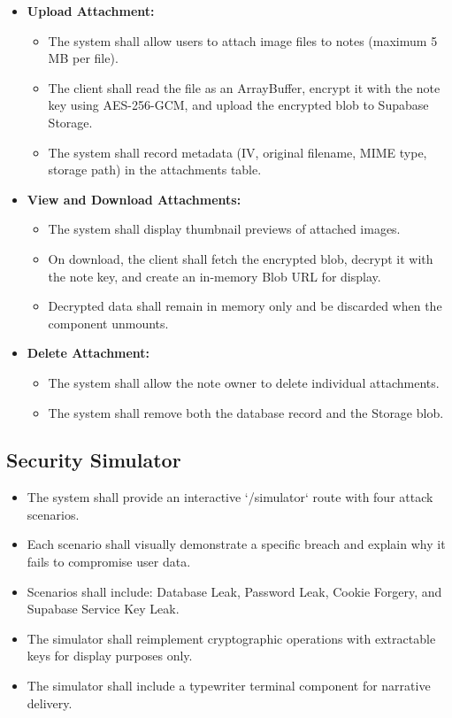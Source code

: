 \begin{itemize}
    \item \textbf{Upload Attachment:}
    \begin{itemize}
        \item The system shall allow users to attach image files to notes (maximum 5 MB per file).
        \item The client shall read the file as an ArrayBuffer, encrypt it with the note key using AES-256-GCM, and upload the encrypted blob to Supabase Storage.
        \item The system shall record metadata (IV, original filename, MIME type, storage path) in the attachments table.
    \end{itemize}

    \item \textbf{View and Download Attachments:}
    \begin{itemize}
        \item The system shall display thumbnail previews of attached images.
        \item On download, the client shall fetch the encrypted blob, decrypt it with the note key, and create an in-memory Blob URL for display.
        \item Decrypted data shall remain in memory only and be discarded when the component unmounts.
    \end{itemize}

    \item \textbf{Delete Attachment:}
    \begin{itemize}
        \item The system shall allow the note owner to delete individual attachments.
        \item The system shall remove both the database record and the Storage blob.
    \end{itemize}
\end{itemize}

\subsection{Security Simulator}

\begin{itemize}
    \item The system shall provide an interactive `/simulator` route with four attack scenarios.
    \item Each scenario shall visually demonstrate a specific breach and explain why it fails to compromise user data.
    \item Scenarios shall include: Database Leak, Password Leak, Cookie Forgery, and Supabase Service Key Leak.
    \item The simulator shall reimplement cryptographic operations with extractable keys for display purposes only.
    \item The simulator shall include a typewriter terminal component for narrative delivery.
\end{itemize}

